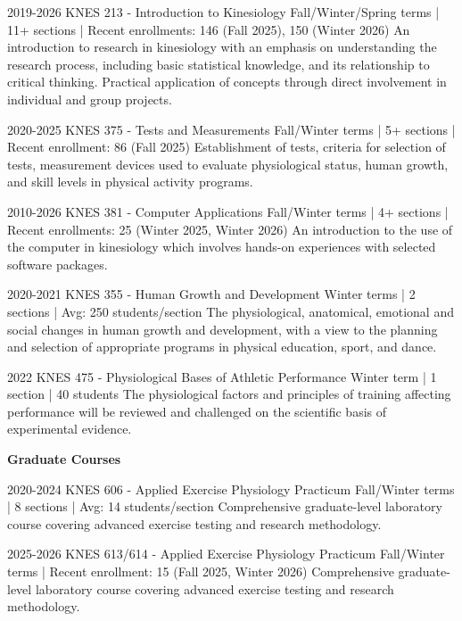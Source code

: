 \documentclass[]{friggeri-cv}
\begin{document}
\begin{entrylist}
\entry
{2019-2026}
{KNES 213 - Introduction to Kinesiology}
{Fall/Winter/Spring terms | 11+ sections | Recent enrollments: 146 (Fall 2025), 150 (Winter 2026)}
{An introduction to research in kinesiology with an emphasis on understanding the research process, including basic statistical knowledge, and its relationship to critical thinking. Practical application of concepts through direct involvement in individual and group projects.}

\entry
{2020-2025}
{KNES 375 - Tests and Measurements}
{Fall/Winter terms | 5+ sections | Recent enrollment: 86 (Fall 2025)}
{Establishment of tests, criteria for selection of tests, measurement devices used to evaluate physiological status, human growth, and skill levels in physical activity programs.}

\entry
{2010-2026}
{KNES 381 - Computer Applications}
{Fall/Winter terms | 4+ sections | Recent enrollments: 25 (Winter 2025, Winter 2026)}
{An introduction to the use of the computer in kinesiology which involves hands-on experiences with selected software packages.}

\entry
{2020-2021}
{KNES 355 - Human Growth and Development}
{Winter terms | 2 sections | Avg: 250 students/section}
{The physiological, anatomical, emotional and social changes in human growth and development, with a view to the planning and selection of appropriate programs in physical education, sport, and dance.}

\entry
{2022}
{KNES 475 - Physiological Bases of Athletic Performance}
{Winter term | 1 section | 40 students}
{The physiological factors and principles of training affecting performance will be reviewed and challenged on the scientific basis of experimental evidence.}
\end{entrylist}

{\Large\textbf{Graduate Courses}}

\begin{entrylist}
\entry
{2020-2024}
{KNES 606 - Applied Exercise Physiology Practicum}
{Fall/Winter terms | 8 sections | Avg: 14 students/section}
{Comprehensive graduate-level laboratory course covering advanced exercise testing and research methodology.}

\entry
{2025-2026}
{KNES 613/614 - Applied Exercise Physiology Practicum}
{Fall/Winter terms | Recent enrollment: 15 (Fall 2025, Winter 2026)}
{Comprehensive graduate-level laboratory course covering advanced exercise testing and research methodology.}
\end{entrylist}
\end{document}

